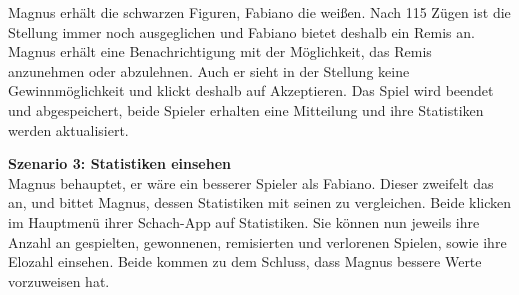 \documentclass[parskip=full]{scrartcl}
\begin{document}
Magnus erhält die schwarzen Figuren, Fabiano die weißen. Nach 115 Zügen ist die Stellung immer noch ausgeglichen und Fabiano bietet deshalb ein \gls{Remis} an. Magnus erhält eine Benachrichtigung mit der Möglichkeit, das \gls{Remis} anzunehmen oder abzulehnen. Auch er sieht in der Stellung keine Gewinnmöglichkeit und klickt deshalb auf \glqq Akzeptieren\grqq. Das Spiel wird beendet und abgespeichert, beide Spieler erhalten eine Mitteilung und ihre Statistiken werden aktualisiert.

\textbf{Szenario 3: \glqq Statistiken einsehen\grqq} \\
Magnus behauptet, er wäre ein besserer Spieler als Fabiano. Dieser zweifelt das an, und bittet Magnus, dessen Statistiken mit seinen zu vergleichen. Beide klicken im Hauptmenü ihrer Schach-App auf \glqq Statistiken\grqq. Sie können nun jeweils ihre Anzahl an gespielten, gewonnenen, remisierten und verlorenen Spielen, sowie ihre \gls{Elo}zahl einsehen. Beide kommen zu dem Schluss, dass Magnus bessere Werte vorzuweisen hat.
\pagebreak
\end{document}
